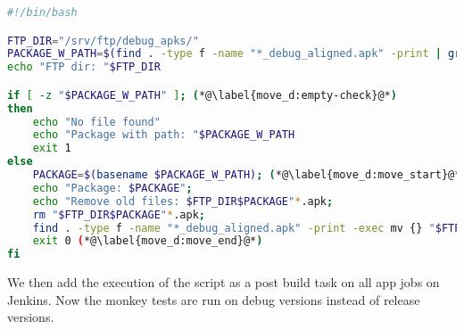 \begin{lstlisting}[language=bash,showstringspaces=false,caption=Script that moves the debug APK to the ftp server,label=lst:move_debug_apk]
#!/bin/bash

FTP_DIR="/srv/ftp/debug_apks/"
PACKAGE_W_PATH=$(find . -type f -name "*_debug_aligned.apk" -print | grep ".+(?=_v[0-9]+\.[0-9]+b[0-9]+_debug_aligned\.apk)" -Po) (*@\label{move_d:package}@*)
echo "FTP dir: "$FTP_DIR

if [ -z "$PACKAGE_W_PATH" ]; (*@\label{move_d:empty-check}@*)
then
    echo "No file found"
    echo "Package with path: "$PACKAGE_W_PATH
    exit 1
else
    PACKAGE=$(basename $PACKAGE_W_PATH); (*@\label{move_d:move_start}@*)
    echo "Package: $PACKAGE";
    echo "Remove old files: $FTP_DIR$PACKAGE"*.apk;
    rm "$FTP_DIR$PACKAGE"*.apk;
    find . -type f -name "*_debug_aligned.apk" -print -exec mv {} "$FTP_DIR" \;
    exit 0 (*@\label{move_d:move_end}@*)
fi
\end{lstlisting}

We then add the execution of the script as a post build task on all app jobs on Jenkins. 
Now the monkey tests are run on debug versions instead of release versions.